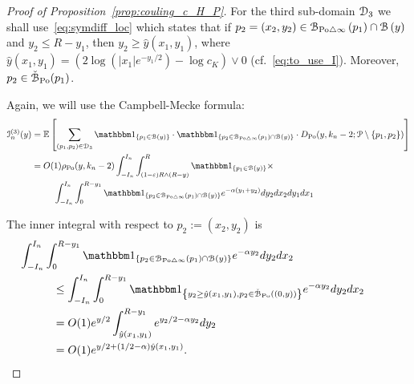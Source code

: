 \begin{proof}[Proof of Proposition~\ref{prop:couling_c_H_P}]
For the third sub-domain $\mathcal{D}_{3}$ we shall use~\eqref{eq:symdiff_loc} which states that if 
$p_2=(x_2,y_2) \in {\mathcal B}_{{\mathrm{Po}} \bigtriangleup \infty}\left(p_1\right)\cap {\mathcal B}\left(y\right)$ and $y_2\leq R - y_1$, then 
$y_2 \geq \hat{y}(x_1,y_1)$, where $\hat{y}(x_1,y_1) = \left(2 \log(|x_1|e^{-y_1/2}) - \log c_K \right) \vee 0$ (cf.~\eqref{eq:to_use_I}). Moreover, $p_2 \in \check{{\mathcal B}}_{{\mathrm{Po}}}(p_1)$.


Again, we will use the Campbell-Mecke formula: 
\begin{align*}
	\mathcal{I}_n^{(3)}(y) &= \Exp { \sum_{(p_1,p_2)  \in \dom{3}} 
		\ind{p_1 \in \BallHyp{y}} \cdot \ind{p_2 \in \BallSym{p_1} \cap \BallHyp{y}}
		\cdot D_{\Po} (y,k_n-2;\Pcal \setminus \{ p_1, p_2\})} \\
	&= O(1) \rho_{\Po}(y,k_n-2) \int_{-I_n}^{I_n} \int_{(1-\eps) R \wedge (R-y)}^{R} \ind{p_1 \in \BallHyp{y}}
		\times\\
	&\hspace{25pt} \int_{-I_n}^{I_n} \int_{0}^{R-y_1} 
		\ind{p_2 \in \BallSym{p_1} \cap \BallHyp{y}} 
		e^{-\alpha(y_1 + y_2)} dy_2 dx_2 dy_1 dx_1 \\
\end{align*}

The inner integral with respect to $p_2 := (x_2,y_2)$ is 
\begin{align*}
	&\hspace{-30pt} \int_{-I_n}^{I_n} \int_{0}^{R - y_1}  \ind{p_2 \in \BallSym{p_1}\cap \BallHyp{y}}  
		e^{-\alpha y_2} dy_2 dx_2\\
	&\leq \int_{-I_n}^{I_n} \int_{0}^{R-y_1}  \ind{y_2 \geq \hat{y}(x_1,y_1), p_2 \in \FatBallHyp{(0,y)}}  
		e^{-\alpha y_2} dy_2 dx_2 \\
	&= O(1) e^{y/2} \int_{\hat{y}(x_1,y_1)}^{R - y_1} e^{y_2/2 - \alpha y_2} dy_2 \\
	&= O(1) e^{y/2 + (1/2 -\alpha) \hat{y}(x_1,y_1)}.
\end{align*}


\end{proof}
